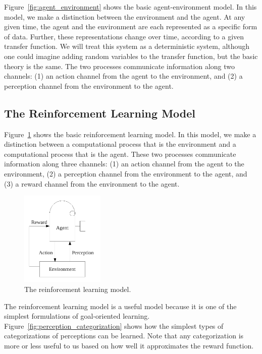 Figure~\ref{fig:agent_environment} shows the basic agent-environment
model.  In this model, we make a distinction between the environment
and the agent.  At any given time, the agent and the environment are
each represented as a specific form of data.  Further, these
representations change over time, according to a given transfer
function.  We will treat this system as a deterministic system,
although one could imagine adding random variables to the transfer
function, but the basic theory is the same.  The two processes
communicate information along two channels: (1) an action channel from
the agent to the environment, and (2) a perception channel from the
environment to the agent.  





\subsection{The Reinforcement Learning Model}

Figure~\ref{fig:reinforcement_learning} shows the basic reinforcement
learning model.  In this model, we make a distinction between a
computational process that is the environment and a computational
process that is the agent.  These two processes communicate
information along three channels: (1) an action channel from the agent
to the environment, (2) a perception channel from the environment to
the agent, and (3) a reward channel from the environment to the agent.

\begin{figure}[bth]
  \center
  \includegraphics[width=4cm]{gfx/reinforcement_learning}
  \caption[The reinforcement learning model]{The reinforcement learning model.}
  \label{fig:reinforcement_learning}
\end{figure}

The reinforcement learning model is a useful model because it is one
of the simplest formulations of goal-oriented learning.
Figure~\ref{fig:perception_categorization} shows how the simplest
types of categorizations of perceptions can be learned.  Note that any
categorization is more or less useful to us based on how well it
approximates the reward function.

